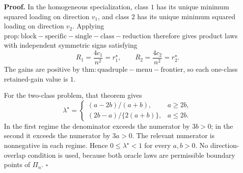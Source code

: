 \textbf{Proof.}
In the homogeneous specialization, class \(1\) has its unique minimum squared loading on direction \(v_1\), and class \(2\) has its unique minimum squared loading on direction \(v_2\).  Applying \(\mathrm{prop:block-specific-single-class-reduction}\) therefore gives product laws with independent symmetric signs satisfying
\[
R_1=\frac{4c_1}{n^2}=r_1^\star,
\qquad
R_2=\frac{4c_2}{n^2}=r_2^\star.
\tag{1}
\]
The gains are positive by \(\mathrm{thm:quadruple-menu-frontier}\), so each one-class retained-gain value is \(1\).

For the two-class problem, that theorem gives
\[
\lambda^\star=
\begin{cases}
(a-2b)/(a+b),&a\ge2b,\\[4pt]
(2b-a)/\{2(a+b)\},&a\le2b.
\end{cases}
\]
In the first regime the denominator exceeds the numerator by \(3b>0\); in the second it exceeds the numerator by \(3a>0\).  The relevant numerator is nonnegative in each regime.  Hence \(0\le\lambda^\star<1\) for every \(a,b>0\).  No direction-overlap condition is used, because both oracle laws are permissible boundary points of \(\Pi_n\). \(\square\)